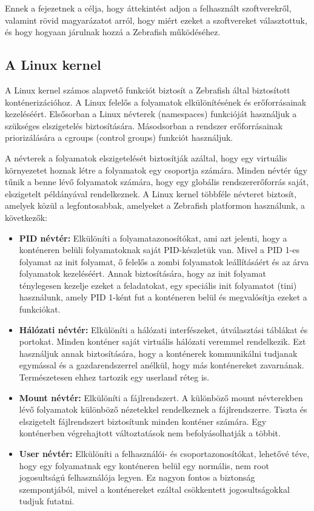 Ennek a fejezetnek a célja, hogy áttekintést adjon a felhasznált szoftverekről, valamint rövid magyarázatot arról, hogy miért ezeket a szoftvereket választottuk, és hogy hogyaan járulnak hozzá a Zebrafish működéséhez.

\subsection{A Linux kernel}

A Linux kernel számos alapvető funkciót biztosít a Zebrafish által biztosított konténerizációhoz. A Linux felelős a folyamatok elkülönítésének és erőforrásainak kezeléséért. Elsősorban a Linux névterek (namespaces) funkcióját használjuk a szükséges elszigetelés biztosítására. Másodsorban a rendszer erőforrásainak priorizálására a cgroups (control groups) funkciót használjuk.

A névterek a folyamatok elszigetelését biztosítják azáltal, hogy egy virtuális környezetet hoznak létre a folyamatok egy csoportja számára. Minden névtér úgy tűnik a benne lévő folyamatok számára, hogy egy globális rendszererőforrás saját, elszigetelt példányával rendelkeznek. A Linux kernel többféle névteret biztosít, amelyek közül a legfontosabbak, amelyeket a Zebrafish platformon használunk, a következők:
\begin{itemize}
    \item \textbf{PID névtér:} Elkülöníti a folyamatazonosítókat, ami azt jelenti, hogy a konténeren belüli folyamatoknak saját PID-készletük van. Mivel a PID 1-es folyamat az init folyamat, ő felelős a zombi folyamatok leállításáért és az árva folyamatok kezeléséért. Annak biztosítására, hogy az init folyamat ténylegesen kezelje ezeket a feladatokat, egy speciális init folyamatot (tini) használunk, amely PID 1-ként fut a konténeren belül és megvalósítja ezeket a funkciókat.
    \item \textbf{Hálózati névtér:} Elkülöníti a hálózati interfészeket, útválasztási táblákat és portokat. Minden konténer saját virtuális hálózati veremmel rendelkezik. Ezt használjuk annak biztosítására, hogy a konténerek kommunikálni tudjanak egymással és a gazdarendszerrel anélkül, hogy más konténereket zavarnának. Természetesen ehhez tartozik egy userland réteg is.
    \item \textbf{Mount névtér:} Elkülöníti a fájlrendszert. A különböző mount névterekben lévő folyamatok különböző nézetekkel rendelkeznek a fájlrendszerre. Tiszta és elszigetelt fájlrendszert biztosítunk minden konténer számára. Egy konténerben végrehajtott változtatások nem befolyásolhatják a többit.
    \item \textbf{User névtér:} Elkülöníti a felhasználói- és csoportazonosítókat, lehetővé téve, hogy egy folyamatnak egy konténeren belül egy normális, nem root jogosultságú felhasználója legyen. Ez nagyon fontos a biztonság szempontjából, mivel a konténereket ezáltal csökkentett jogosultságokkal tudjuk futatni.
\end{itemize}

